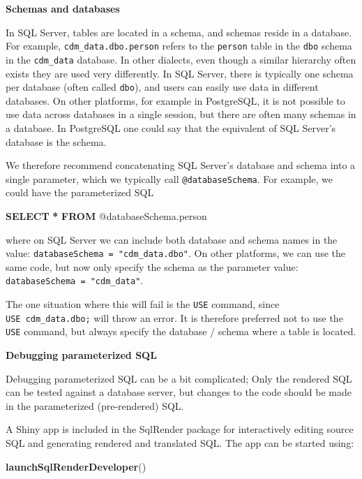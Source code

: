 \documentclass[11pt]{book}
\newenvironment{Shaded}{\begin{snugshade}}{\end{snugshade}}
\newcommand{\KeywordTok}[1]{\textcolor[rgb]{0.13,0.29,0.53}{\textbf{#1}}}
\newcommand{\NormalTok}[1]{#1}
\newcommand{\OperatorTok}[1]{\textcolor[rgb]{0.81,0.36,0.00}{\textbf{#1}}}
\theoremstyle{definition}
\theoremstyle{definition}
\theoremstyle{definition}
\theoremstyle{remark}
\begin{document}
\textbf{Schemas and databases}

In SQL Server, tables are located in a schema, and schemas reside in a database. For example, \texttt{cdm\_data.dbo.person} refers to the \texttt{person} table in the \texttt{dbo} schema in the \texttt{cdm\_data} database. In other dialects, even though a similar hierarchy often exists they are used very differently. In SQL Server, there is typically one schema per database (often called \texttt{dbo}), and users can easily use data in different databases. On other platforms, for example in PostgreSQL, it is not possible to use data across databases in a single session, but there are often many schemas in a database. In PostgreSQL one could say that the equivalent of SQL Server's database is the schema.

We therefore recommend concatenating SQL Server's database and schema into a single parameter, which we typically call \texttt{@databaseSchema}. For example, we could have the parameterized SQL

\begin{Shaded}
\begin{Highlighting}[]
\KeywordTok{SELECT} \OperatorTok{*} \KeywordTok{FROM}\NormalTok{ @databaseSchema.person}
\end{Highlighting}
\end{Shaded}

where on SQL Server we can include both database and schema names in the value: \texttt{databaseSchema\ =\ "cdm\_data.dbo"}. On other platforms, we can use the same code, but now only specify the schema as the parameter value: \texttt{databaseSchema\ =\ "cdm\_data"}.

The one situation where this will fail is the \texttt{USE} command, since \texttt{USE\ cdm\_data.dbo;} will throw an error. It is therefore preferred not to use the \texttt{USE} command, but always specify the database / schema where a table is located.

\textbf{Debugging parameterized SQL}

Debugging parameterized SQL can be a bit complicated; Only the rendered SQL can be tested against a database server, but changes to the code should be made in the parameterized (pre-rendered) SQL.

A Shiny app is included in the SqlRender package for interactively editing source SQL and generating rendered and translated SQL. The app can be started using:

\begin{Shaded}
\begin{Highlighting}[]
\KeywordTok{launchSqlRenderDeveloper}\NormalTok{()}
\end{Highlighting}
\end{Shaded}
\end{document}
